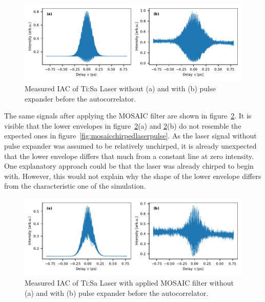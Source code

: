 \begin{figure}[H]
	\centering
	\includegraphics[width=\linewidth]{figures/chirp/plots/measured_chirped_laser_pulse_before_MOSAIC}
	\caption{Measured IAC of Ti:Sa Laser without (a) and with (b) pulse expander before the autocorrelator.}
	\label{fig:measuredchirpedlaserpulsebeforemosaic}
\end{figure}

The same signals after applying the \ac{MOSAIC} filter are shown in figure~\ref{fig:measuredchirpedlaserpulseaftermosaic}.
It is visible that the lower envelopes in figure~\ref{fig:measuredchirpedlaserpulseaftermosaic}(a) and \ref{fig:measuredchirpedlaserpulseaftermosaic}(b) do not resemble the expected ones in figure~\ref{fig:mosaicchirpedlaserpulse}.
As the laser signal without pulse expander was assumed to be relatively unchirped, it is already unexpected that the lower envelope differs that much from a constant line at zero intensity.
One explanatory approach could be that the laser was already chirped to begin with. However, this would not explain why the shape of the lower envelope differs from the characteristic one of the simulation.

\begin{figure}[H]
	\centering
	\includegraphics[width=\linewidth]{figures/chirp/plots/measured_chirped_laser_pulse_after_MOSAIC}
	\caption{Measured IAC of Ti:Sa Laser with applied MOSAIC filter without (a) and with (b) pulse expander before the autocorrelator.}
	\label{fig:measuredchirpedlaserpulseaftermosaic}
\end{figure}

